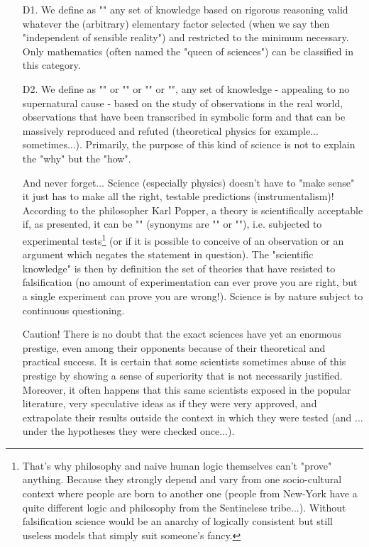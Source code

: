 \begin{itemize}
	\item[D1.] We define as "" any set of knowledge based on rigorous reasoning valid whatever the (arbitrary) elementary factor selected (when we say then "independent of sensible reality") and restricted to the minimum necessary. Only mathematics (often named the "queen of sciences") can be classified in this category. 

	\item[D2.] We define as "" or "" or "" or "", any set of knowledge - appealing to no supernatural cause - based on the study of observations in the real world, observations that have been transcribed in symbolic form and that can be massively reproduced and refuted (theoretical physics for example... sometimes...). Primarily, the purpose of this kind of science is not to explain the "why" but the "how". 
	
	And never forget... Science (especially physics) doesn't have to "make sense" it just has to make all the right, testable predictions (instrumentalism)! According to the philosopher Karl Popper, a theory is scientifically acceptable if, as presented, it can be "" (synonyms are "" or ""), i.e. subjected to experimental tests\footnote{That's why philosophy and naive human logic themselves can't "prove" anything. Because they strongly depend and vary from one socio-cultural context where people are born to another one (people from New-York have a quite different logic and philosophy from the Sentinelese tribe...). Without falsification science would be an anarchy of logically consistent but still useless models that simply suit someone's fancy.} (or  if it is possible to conceive of an observation or an argument which negates the statement in question). The "scientific knowledge" is then by definition the set of theories that have resisted to falsification (no amount of experimentation can ever prove you are right, but a single experiment can prove you are wrong!). Science is by nature subject to continuous questioning. 

	\begin{tcolorbox}[enhanced,colback=red!5!white,colframe=black!50!red,boxrule=1pt,arc=0pt,outer arc=0pt,drop lifted shadow,after skip=10pt plus 2pt]
	\bcbombe Caution! There is no doubt that the exact sciences have yet an enormous prestige, even among their opponents because of their theoretical and practical success. It is certain that some scientists sometimes abuse of this prestige by showing a sense of superiority that is not necessarily justified. Moreover, it often happens that this same scientists exposed in the popular literature, very speculative ideas as if they were very approved, and extrapolate their results outside the context in which they were tested (and ... under the hypotheses they were checked once...).
	\end{tcolorbox}
	 

\end{itemize}
